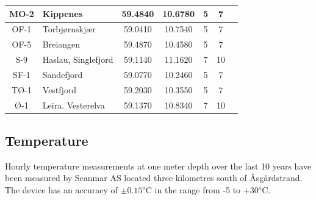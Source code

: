 \begin{table}
\begin{tabular}{|clcccc@{}c|}
MO-2 & Kippenes & 59.4840 & 10.6780 & 5 & 7 &\\ \hline
OF-1 & Torbj{\o}rnskj{\ae}r & 59.0410 & 10.7540 & 5 & 7 &\\ 
OF-5 & Breiangen & 59.4870 & 10.4580 & 5 & 7 &\\ \hline
S-9  & Haslau, Singlefjord & 59.1140 & 11.1620 & 7 & 10 &\\ 
SF-1 & Sandefjord & 59.0770 & 10.2460 & 5 & 7 &\\ \hline
T{\O}-1 & Vestfjord & 59.2030 & 10.3550 & 5 & 7 &\\ 
{\O}-1 & Leira. Vesterelva & 59.1370 & 10.8340 & 7 & 10 &\\ \hline
\end{tabular}
\end{table}



\subsection{Temperature}

Hourly temperature measurements at one meter depth over the last 10 years have been measured by Scanmar AS located three kilometres south of {\AA}sg{\aa}rdstrand. The device has an accuracy of $\pm 0.15^o$C in the range from -5 to +30$^o$C. 






